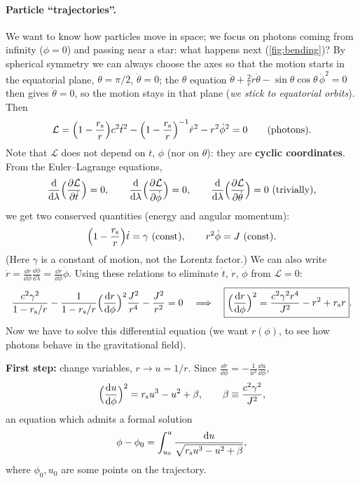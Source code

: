 \paragraph{Particle ``trajectories''.} We want to know how particles move in space; we focus on photons coming from infinity ($\phi=0$) and passing near a star: what happens next (\cref{fig:bending})? By spherical symmetry we can always choose the axes so that the motion starts in the equatorial plane, $\theta=\pi/2$, $\dot\theta=0$; the $\theta$ equation $\ddot\theta+\frac2r\dot r\dot\theta-\sin\theta\cos\theta\,\dot\phi^2=0$ then gives $\ddot\theta=0$, so the motion stays in that plane (\emph{we stick to equatorial orbits}). Then
\begin{equation}
  \mathcal L=\Big(1-\frac{r_{\mathrm s}} r\Big)c^2\dot t^2-\Big(1-\frac{r_{\mathrm s}} r\Big)^{-1}\dot r^2-r^2\dot\phi^2=0\qquad\text{(photons)}.
\end{equation}
Note that $\mathcal L$ does not depend on $t$, $\phi$ (nor on $\theta$): they are \textbf{cyclic coordinates}. From the Euler--Lagrange equations,
\[
  \frac{\mathrm{d}}{\mathrm{d}\lambda}\Big(\frac{\partial\mathcal L}{\partial\dot t}\Big)=0,\qquad\frac{\mathrm{d}}{\mathrm{d}\lambda}\Big(\frac{\partial\mathcal L}{\partial\dot\phi}\Big)=0,\qquad\frac{\mathrm{d}}{\mathrm{d}\lambda}\Big(\frac{\partial\mathcal L}{\partial\dot\theta}\Big)=0\ \text{(trivially)},
\]
we get two conserved quantities (energy and angular momentum):
\begin{equation}
  \Big(1-\frac\rs r\Big)\dot t=\gamma\ (\text{const}),\qquad r^2\dot\phi=J\ (\text{const}).
\end{equation}
(Here $\gamma$ is a constant of motion, not the Lorentz factor.) We can also write $\dot r=\frac{\dd r}{\dd\phi}\frac{\dd\phi}{\dd\lambda}=\frac{\dd r}{\dd\phi}\dot\phi$. Using these relations to eliminate $\dot t$, $\dot r$, $\dot\phi$ from $\mathcal L=0$:
\[
  \frac{c^2\gamma^2}{1-r_{\mathrm s}/r}-\frac{1}{1-r_{\mathrm s}/r}\Big(\frac{\mathrm{d} r}{\mathrm{d}\phi}\Big)^2\frac{J^2}{r^4}-\frac{J^2}{r^2}=0
  \quad\Longrightarrow\quad
  \boxed{\Big(\frac{\mathrm{d} r}{\mathrm{d}\phi}\Big)^2=\frac{c^2\gamma^2r^4}{J^2}-r^2+r_{\mathrm s} r} .
\]
Now we have to solve this differential equation (we want $r(\phi)$, to see how photons behave in the gravitational field).

\textbf{First step:} change variables, $r\to u=1/r$. Since $\frac{\dd r}{\dd\phi}=-\frac{1}{u^2}\frac{\dd u}{\dd\phi}$,
\begin{equation}
  \Big(\frac{\mathrm{d} u}{\mathrm{d}\phi}\Big)^2=r_{\mathrm s} u^3-u^2+\beta,\qquad\beta\equiv\frac{c^2\gamma^2}{J^2},
\end{equation}
an equation which admits a formal solution
\[
  \phi-\phi_0=\int_{u_0}^u\frac{\mathrm{d} u}{\sqrt{r_{\mathrm s} u^3-u^2+\beta}},
\]
where $\phi_0,u_0$ are some points on the trajectory.

